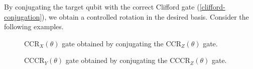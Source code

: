 By conjugating the target qubit with the correct Clifford gate (\ref{clifford-conjugation}), we obtain a controlled rotation in the desired basis. Consider the following examples.

\begin{figure}[H]
    \centering
    \caption{CCR$_X(\theta)$ gate obtained by conjugating the CCR$_Z(\theta)$ gate.}
\end{figure}

\begin{figure}[H]
    \centering
    \caption{CCCR$_Y(\theta)$ gate obtained by conjugating the CCCR$_Z(\theta)$ gate.}
\end{figure}

